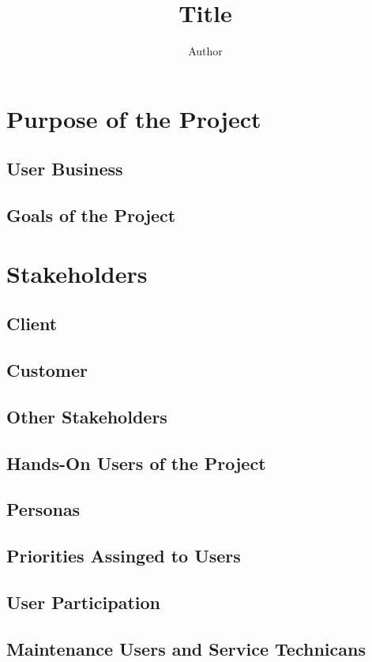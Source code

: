 \documentclass[]{article}
\title{Title}
\author{Author}
\begin{document}
\maketitle
\tableofcontents

\begin{abstract}

\end{abstract}

\section{Purpose of the Project}
\subsection{User Business}
\subsection{Goals of the Project}

\section{Stakeholders}
\subsection{Client}
\subsection{Customer}
\subsection{Other Stakeholders}
\subsection{Hands-On Users of the Project}
\subsection{Personas}
\subsection{Priorities Assinged to Users}
\subsection{User Participation}
\subsection{Maintenance Users and Service Technicans}
\end{document}
